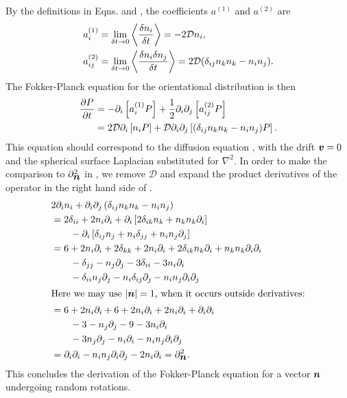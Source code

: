 \documentclass[thesis.tex]{subfiles}
\begin{document}
By the definitions in Eqns.  and , the coefficients $a^{(1)}$ and $a^{(2)}$ are
\begin{align}
	a_i^{(1)} &= \lim_{\delta t\to0}\left\langle\frac{\delta n_i}{\delta t}\right\rangle = -2\mathcal D n_i,\nn\\
	a_{ij}^{(2)} &= \lim_{\delta t\to0}\left\langle\frac{\delta n_i\delta  n_j}{\delta t}\right\rangle = 2\mathcal D(\delta_{ij}n_kn_k - n_i n_j).\eqnlab{a1a2}
\end{align}
The Fokker-Planck equation for the orientational distribution is then
\begin{align}
	\frac{\partial P}{\partial t} &= -\partial_i\left[a^{(1)}_i P\right] + \frac{1}{2}\partial_i\partial_j\left[a^{(2)}_{ij} P\right]\nn\\
&= 2\mathcal D\partial_i \left[n_i P\right] + \mathcal D\partial_i \partial_j\left[(\delta_{ij}n_kn_k-n_in_j) P\right].\eqnlab{fpe1}	
\end{align}
This equation should correspond to the diffusion equation , with the drift $\mbox{\boldmath$v$}=0$ and the spherical surface Laplacian  substituted for $\nabla^2$. In order to make the comparison to $\partial^2_{\mbox{\boldmath$n$}}$ in , we remove $\mathcal D$ and expand the product derivatives of the operator in the right hand side of .
\begin{align*}
	& 2\partial_i n_i + \partial_i \partial_j\left(\delta_{ij}n_kn_k-n_in_j\right)\\
	&= 2\delta_{ii} + 2n_i\partial_i + \partial_i\left[2\delta_{ik}n_k+n_kn_k\partial_i\right]  \\
	&\qquad - \partial_i\left[\delta_{ij}n_j + n_i\delta_{jj}+ n_in_j\partial_j\right]\\
	&=6 + 2n_i\partial_i + 2\delta_{kk} + 2n_i\partial_i + 2\delta_{ik}n_k\partial_i + n_kn_k\partial_i\partial_i \\
	&\qquad -\delta_{jj}-n_j\partial_j-3\delta_{ii}-3n_i\partial_i\\
	&\qquad-\delta_{ii}n_j\partial_j-n_i\delta_{ij}\partial_j-n_in_j\partial_i\partial_j \\
	\intertext{Here we may use $|\mbox{\boldmath$n$}|=1$, when it occurs outside derivatives:}
	&=6 + 2n_i\partial_i + 6 + 2n_i\partial_i + 2n_i\partial_i + \partial_i\partial_i \\
	&\qquad -3-n_j\partial_j-9-3n_i\partial_i\\
	&\qquad-3n_j\partial_j-n_i\partial_i-n_in_j\partial_i\partial_j \\
	&= \partial_i\partial_i -n_in_j\partial_i\partial_j - 2 n_i \partial_i = \partial^2_{\mbox{\boldmath$n$}}.
\end{align*}
This concludes the derivation of the Fokker-Planck equation for a vector $\mbox{\boldmath$n$}$ undergoing random rotations.
\end{document}
